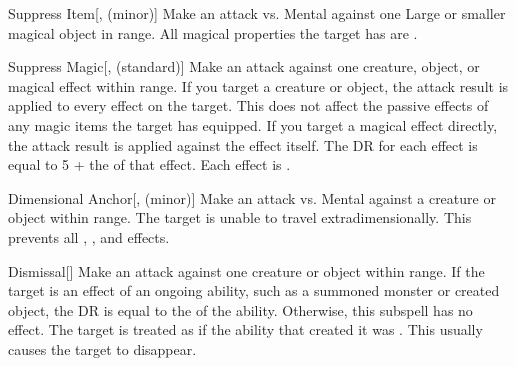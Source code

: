 \begin{ability}[\nth{1}]{Suppress Item}[,  (minor)]
Make an attack vs. Mental against one Large or smaller magical object in \rngmed range.
\hit All magical properties the target has are .
\end{ability}
\vspace{0.25em}



\begin{ability}[\nth{1}]{Suppress Magic}[,  (standard)]
Make an attack against one creature, object, or magical effect within \rngmed range.
If you target a creature or object, the attack result is applied to every  effect on the target.
This does not affect the passive effects of any magic items the target has equipped.
If you target a magical effect directly, the attack result is applied against the effect itself.
The DR for each effect is equal to 5 + the  of that effect.
\hit Each effect is .
\end{ability}
\vspace{0.25em}



\begin{ability}[\nth{2}]{Dimensional Anchor}[,  (minor)]
Make an attack vs. Mental against a creature or object within \rngmed range.
\hit The target is unable to travel extradimensionally.
This prevents all , , and  effects.
\end{ability}
\vspace{0.25em}



\begin{ability}[\nth{2}]{Dismissal}[]
Make an attack against one creature or object within \rngmed range.
If the target is an effect of an ongoing  ability, such as a summoned monster or created object, the DR is equal to the  of the ability.
Otherwise, this subspell has no effect.
\hit The target is treated as if the ability that created it was .
This usually causes the target to disappear.
\end{ability}
\vspace{0.25em}



